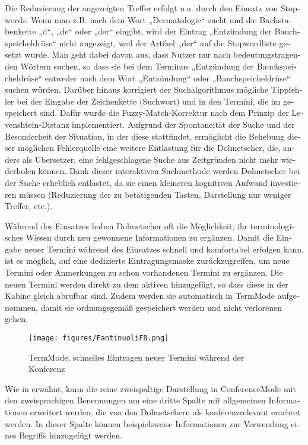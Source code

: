 \documentclass[output=paper]{LSP/langsci}
\begin{document}
\begin{otherlanguage}{ngerman}
Die Reduzierung der angezeigten Treffer erfolgt u.a. durch den Einsatz von Stopwords. Wenn man z.B. nach dem Wort „Dermatologie“ sucht und die Buchstabenkette „d“, „de“ oder „der“ eingibt, wird der Eintrag „Entzündung der Bauchspeicheldrüse“ nicht angezeigt, weil der Artikel „der“ auf die Stopwordliste gesetzt wurde. Man geht dabei davon aus, dass Nutzer nur nach bedeutungstragenden Wörtern suchen, so dass sie bei dem Terminus „Entzündung der Bauchspeicheldrüse“ entweder nach dem Wort „Entzündung“ oder „Bauchspeicheldrüse“ suchen würden. Darüber hinaus korrigiert der Suchalgorithmus mögliche Tippfehler bei der Eingabe der Zeichenkette (Suchwort) und in den Termini, die im  gespeichert sind. Dafür wurde die Fuzzy-Match-Korrektur nach dem Prinzip der Levenshtein-Distanz implementiert. Aufgrund der Spontaneität der Suche und der Besonderheit der Situation, in der diese stattfindet, ermöglicht die Behebung dieser möglichen Fehlerquelle eine weitere Entlastung für die Dolmetscher, die, anders als Übersetzer, eine fehlgeschlagene Suche aus Zeitgründen nicht mehr wiederholen können. Dank dieser interaktiven Suchmethode werden Dolmetscher bei der Suche erheblich entlastet, da sie einen kleineren kognitiven Aufwand investieren müssen (Reduzierung der zu betätigenden Tasten, Darstellung nur weniger Treffer, etc.).

Während des Einsatzes haben Dolmetscher oft die Möglichkeit, ihr terminologisches Wissen durch neu gewonnene Informationen zu ergänzen. Damit die Eingabe neuer Termini während des Einsatzes schnell und komfortabel erfolgen kann, ist es möglich, auf eine dedizierte Eintragungsmaske zurückzugreifen, um neue Termini oder Anmerkungen zu schon vorhandenen Termini zu ergänzen. Die neuen Termini werden direkt zu dem aktiven  hinzugefügt, so dass diese in der Kabine gleich abrufbar sind. Zudem werden sie automatisch in TermMode aufgenommen, damit sie ordnungsgemäß gespeichert werden und nicht verlorenen gehen.

\begin{figure}
\texttt{[image: figures/FantinuoliF8.png]}
\caption{TermMode, schnelles Eintragen neuer Termini während der Konferenz}
\label{fig:fantinuoli:8}
\end{figure} 

Wie in  erwähnt, kann die reine zweispaltige Darstellung in ConferenceMode mit den zweisprachigen Benennungen um eine dritte Spalte mit allgemeinen Informationen erweitert werden, die von den Dolmetschern als konferenzrelevant erachtet werden. In dieser Spalte können beispielsweise Informationen zur Verwendung eines Begriffs hinzugefügt werden.


\end{otherlanguage}
\end{document}

